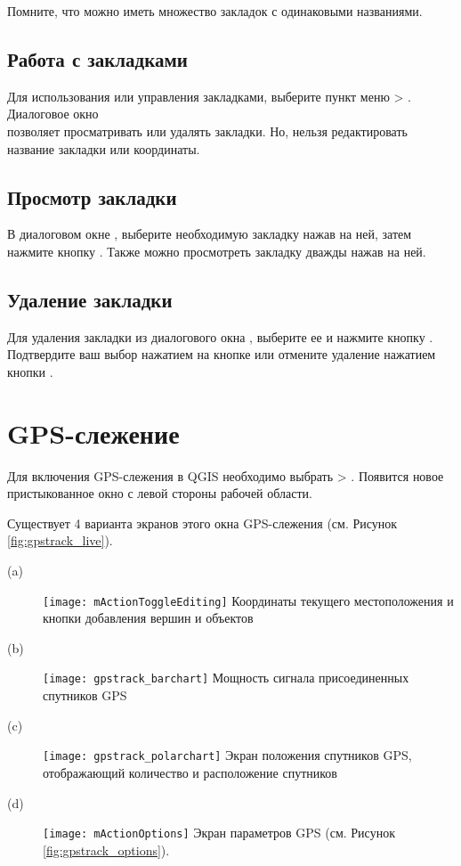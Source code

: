 Помните, что можно иметь множество закладок с одинаковыми названиями.

\subsection{Работа с закладками}
Для использования или управления закладками, выберите пункт меню  > . Диалоговое окно \\
 позволяет просматривать или удалять закладки. Но, нельзя редактировать название закладки или координаты.

\subsection{Просмотр закладки}
В диалоговом окне , выберите необходимую закладку нажав на ней, затем нажмите кнопку . Также можно просмотреть закладку дважды нажав на ней.

\subsection{Удаление закладки}
Для удаления закладки из диалогового окна , выберите ее и нажмите кнопку . Подтвердите ваш выбор нажатием на кнопке  или отмените удаление нажатием кнопки .

\section{GPS-слежение}\label{sec:gpstracking}

Для включения GPS-слежения в QGIS необходимо выбрать  > . Появится новое пристыкованное окно с левой стороны рабочей области.

Существует 4 варианта экранов этого окна GPS-слежения (см. Рисунок \ref{fig:gpstrack_live}).

\begin{description}
 \item[(a)] \texttt{[image: mActionToggleEditing]}
Координаты текущего местоположения и кнопки добавления вершин и объектов
 \item[(b)] \texttt{[image: gpstrack\_barchart]}
Мощность сигнала присоединенных спутников GPS
 \item[(c)] \texttt{[image: gpstrack\_polarchart]}
Экран положения спутников GPS, отображающий количество и расположение спутников
 \item[(d)] \texttt{[image: mActionOptions]}
Экран параметров GPS (см. Рисунок \ref{fig:gpstrack_options}).
\end{description}

